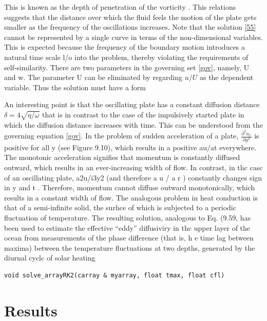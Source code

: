 \documentclass[paper=a4, fontsize=11pt, abstract=on]{scrartcl}
\numberwithin{equation}{section}		%
\numberwithin{figure}{section}			%
\numberwithin{table}{section}				%
\begin{document}
This is known as the depth of penetration of the vorticity \cite{g}. This relations suggests that the distance over which the fluid feels the motion of the plate gets smaller as the frequency of the oscillations increases. Note that the solution \ref{55} cannot be represented by a single curve in terms of the non-dimensional variables. This is expected because the frequency of the boundary motion introduces a natural time scale l/o into the problem, thereby violating the requirements of self-similarity. There are two parameters in the governing set \ref{gov}, namely, U and w. The parameter U can be eliminated by regarding $u / U$ as the dependent variable. Thus the solution must have a form




An interesting point is that the oscillating plate has a constant diffusion distance $\delta = 4\sqrt{\eta/\omega}$ that is in contrast to the case of the impulsively started plate in which the diffusion distance increases with time. This can be understood from
the governing equation \ref{gov}. In the problem of sudden acceleration of a plate,
$\frac{\partial^2 u_x}{\partial y^2}$ is positive for all y (see Figure 9.10), which results in a positive au/at
everywhere. The monotonic acceleration signifies that momentum is constantly
diffused outward, which results in an ever-increasing width of flow. In contrast,
in thc casc of an oscillating plate, a2u/i3y2 (and therefore a u / a r ) constantly
changes sign in y and t . Therefore, momentum cannot diffuse outward monotonically,
which results in a constant width of flow.
The analogous problem in heat conduction is that of a semi-infinite solid, the
surhce of which is subjected to a periodic fluctuation of temperature. The resulting
solution, analogous to Eq. (9.59, has been used to estimate the effective “eddy”
diffusiviry in thc upper layer of the ocean from measurements of the phase difference
(that is, h e time lag between maxima) between the temperature fluctuations at two
depths, generated by the diurnal cyclc of solar heating




\begin{lstlisting}
void solve_arrayRK2(carray & myarray, float tmax, float cfl)
\end{lstlisting}



\newpage
\section{Results}
\end{document}
